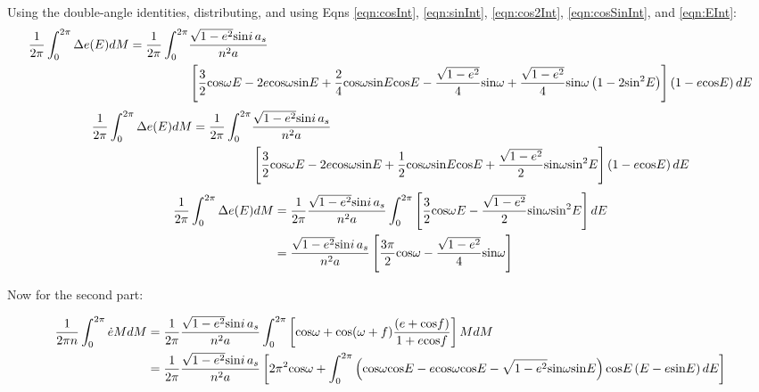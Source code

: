 \documentclass[]{aiaa-tc}%
\begin{document}
Using the double-angle identities, distributing, and using Eqns \ref{eqn:cosInt}, \ref{eqn:sinInt}, \ref{eqn:cos2Int}, \ref{eqn:cosSinInt}, and \ref{eqn:EInt}:
	\begin{equation} 
 \begin{aligned}
\frac{1}{2\pi}\int_{0}^{2\pi}\Delta e(E)dM = \frac{1}{2\pi}\int_{0}^{2\pi}&\frac{\sqrt{1-e^2}\textup{\textup{sin}}i\,a_s}{n^2a} \\ &\left [ \frac{3}{2}\textup{\textup{cos}}\omega E -2e\textup{cos}\omega \textup{sin}E +\frac{2}{4}\textup{cos}\omega \textup{sin}E\textup{cos}E-\frac{\sqrt{1-e^2}}{4}\textup{sin}\omega +\frac{\sqrt{1-e^2}}{4}\textup{sin}\omega \left (1-2\textup{sin}^2E  \right )\right ]\left ( 1-e\textup{cos}E \right )dE
 \end{aligned}
	\end{equation} 
	\begin{equation} 
\begin{aligned}
\frac{1}{2\pi}\int_{0}^{2\pi}\Delta e(E)dM = \frac{1}{2\pi}\int_{0}^{2\pi}&\frac{\sqrt{1-e^2}\textup{\textup{sin}}i\,a_s}{n^2a} \\ &\left [ \frac{3}{2}\textup{\textup{cos}}\omega E -2e\textup{cos}\omega \textup{sin}E +\frac{1}{2}\textup{cos}\omega \textup{sin}E\textup{cos}E +\frac{\sqrt{1-e^2}}{2}\textup{sin}\omega \textup{sin}^2E  \right ]\left ( 1-e\textup{cos}E \right )dE
 \end{aligned}
	\end{equation} 
	\begin{equation} 
\begin{aligned}
\frac{1}{2\pi}\int_{0}^{2\pi}\Delta e(E)dM &= \frac{1}{2\pi}\frac{\sqrt{1-e^2}\textup{\textup{sin}}i\,a_s}{n^2a} \int_{0}^{2\pi}\left [ \frac{3}{2}\textup{cos}\omega E -\frac{\sqrt{1-e^2}}{2}\textup{sin}\omega \textup{sin}^2E \right ]dE \\
 &= \frac{\sqrt{1-e^2}\textup{\textup{sin}}i\,a_s}{n^2a} \left [\frac{3\pi}{2}\textup{cos}\omega -\frac{\sqrt{1-e^2}}{4}\textup{sin}\omega \right ]
 \end{aligned}
\label{eqn:shortPeriod_e_p1}
	\end{equation} 

Now for the second part:

	\begin{equation} 
\begin{aligned}
\frac{1}{2\pi n}\int_{0}^{2\pi}\dot{e}MdM  &= \frac{1}{2\pi}\frac{\sqrt{1-e^2}\textup{\textup{sin}}i\,a_s}{n^2a} \int_{0}^{2\pi}\left [  \textup{cos}\omega +\textup{cos}(\omega +f )\frac{(e+\textup{cos}f)}{1+e\textup{cos}f} \right ]MdM \\ 
 &=\frac{1}{2\pi}\frac{\sqrt{1-e^2}\textup{\textup{sin}}i\,a_s}{n^2a}\left [ 2\pi^2\textup{cos}\omega + \int_{0}^{2\pi} \left ( \textup{cos}\omega \textup{cos}E -e\textup{cos}\omega \textup{cos}E -\sqrt{1-e^2}\textup{sin}\omega \textup{sin}E \right )\textup{cos}E\left ( E-e\textup{sin}E \right )dE\right ]
\end{aligned}
\label{eqn:shortPeriod_e_p21}
	\end{equation} 
\end{document}
